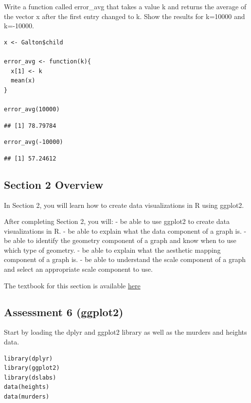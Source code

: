 \documentclass[
]{article}
\begin{document}
Write a function called error\_avg that takes a value k and returns the
average of the vector x after the first entry changed to k. Show the
results for k=10000 and k=-10000.

\begin{verbatim}
x <- Galton$child

error_avg <- function(k){
  x[1] <- k
  mean(x)
}

error_avg(10000)
\end{verbatim}

\begin{verbatim}
## [1] 78.79784
\end{verbatim}

\begin{verbatim}
error_avg(-10000)
\end{verbatim}

\begin{verbatim}
## [1] 57.24612
\end{verbatim}

\hypertarget{section-2-overview}{%
\subsection{Section 2 Overview}\label{section-2-overview}}

In Section 2, you will learn how to create data visualizations in R
using ggplot2.

After completing Section 2, you will: - be able to use ggplot2 to create
data visualizations in R. - be able to explain what the data component
of a graph is. - be able to identify the geometry component of a graph
and know when to use which type of geometry. - be able to explain what
the aesthetic mapping component of a graph is. - be able to understand
the scale component of a graph and select an appropriate scale component
to use.

The textbook for this section is available
\href{https://rafalab.github.io/dsbook/ggplot2.html}{here}

\hypertarget{assessment-6-ggplot2}{%
\subsection{Assessment 6 (ggplot2)}\label{assessment-6-ggplot2}}

Start by loading the dplyr and ggplot2 library as well as the murders
and heights data.

\begin{verbatim}
library(dplyr)
library(ggplot2)
library(dslabs)
data(heights)
data(murders)
\end{verbatim}
\end{document}
